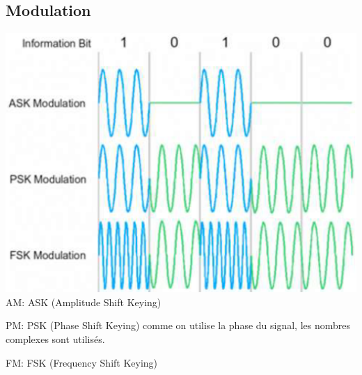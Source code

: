 \subsection*{Modulation}
\begin{multicols*}{4}
    \includegraphics[width=\columnwidth]{images/binary_modulation.png}
    AM: ASK (Amplitude Shift
    Keying)

    PM: PSK (Phase Shift
    Keying) comme on utilise la phase du signal, les nombres complexes sont utilisés.

    FM: FSK (Frequency Shift Keying)


\end{multicols*}
